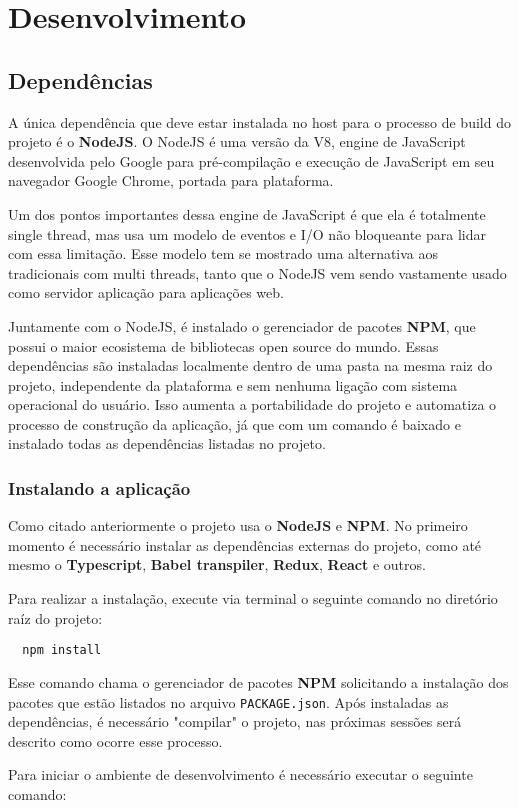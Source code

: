 \documentclass[rel_mlp]{iiufrgs}
\begin{document}
\chapter{Desenvolvimento}


\section{Dependências}
A única dependência que deve estar instalada no host para o processo de build do projeto é o \textbf{NodeJS}.
O NodeJS é uma versão da V8, engine de JavaScript desenvolvida pelo Google para pré-compilação e execução de
JavaScript em seu navegador Google Chrome, portada para plataforma. \par
Um dos pontos importantes dessa engine de JavaScript é que ela é totalmente single thread, mas usa um modelo de eventos e I/O não bloqueante para lidar com essa limitação. Esse modelo tem se mostrado uma alternativa aos tradicionais com multi threads, tanto que o NodeJS vem sendo vastamente usado como servidor aplicação para aplicações web. \par
Juntamente com o NodeJS, é instalado o gerenciador de pacotes \textbf{NPM}, que possui o maior ecosistema de bibliotecas open source do mundo.
Essas dependências são instaladas localmente dentro de uma pasta na mesma raiz do projeto, independente da plataforma e sem nenhuma ligação com sistema operacional do usuário. Isso aumenta a portabilidade do projeto e automatiza o processo de construção da aplicação, já que com um comando é baixado e instalado todas as dependências listadas no projeto.

\subsection{Instalando a aplicação}
Como citado anteriormente o projeto usa o \textbf{NodeJS} e \textbf{NPM}. No primeiro momento é necessário instalar as dependências externas do projeto, como até mesmo o \textbf{Typescript}, \textbf{Babel transpiler}, \textbf{Redux}, \textbf{React} e outros. \par
Para realizar a instalação, execute via terminal o seguinte comando no diretório raíz do projeto:

\begin{lstlisting}
  npm install
\end{lstlisting}

Esse comando chama o gerenciador de pacotes \textbf{NPM} solicitando a instalação dos pacotes que estão listados no arquivo \verb|PACKAGE.json|. Após instaladas as dependências, é necessário "compilar" o projeto, nas próximas sessões será descrito como ocorre esse processo. \par
Para iniciar o ambiente de desenvolvimento é necessário executar o seguinte comando:
\end{document}
